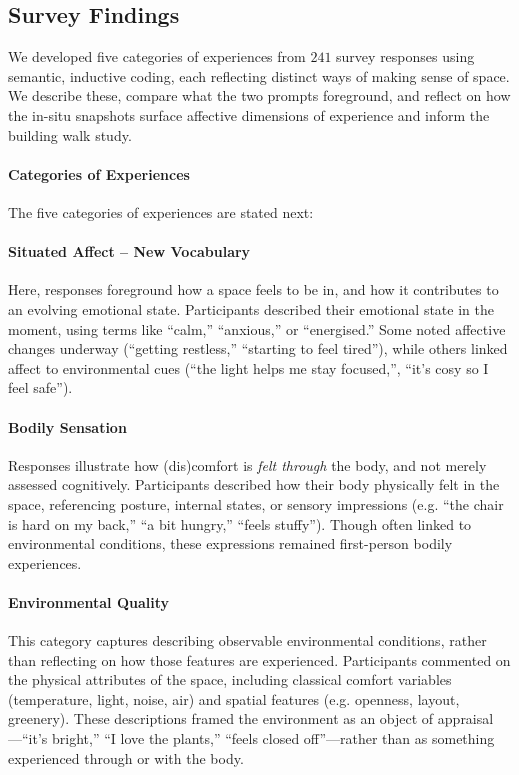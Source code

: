 \subsection{Survey Findings}
\label{sec:ch3-s1-findings}
We developed five categories of experiences from  $241$ survey responses using semantic, inductive coding, each reflecting distinct ways of making sense of space. We describe these, compare what the two prompts foreground, and reflect on how the in-situ snapshots surface affective dimensions of experience and inform the building walk study.

\paragraph{Categories of Experiences} The five categories of experiences are stated next: 

\paragraph{\textbf{Situated Affect – New Vocabulary}} Here, responses foreground how a space feels to be in, and how it contributes to an evolving emotional state. Participants described their emotional state in the moment, using terms like ``calm,'' ``anxious,'' or ``energised.'' Some noted affective changes underway (``getting restless,'' “starting to feel tired”), while others linked affect to environmental cues (``the light helps me stay focused,'', ``it’s cosy so I feel safe''). 

\paragraph{\textbf{Bodily Sensation}} Responses illustrate how (dis)comfort is \textit{felt through} the body, and not merely assessed cognitively. Participants described how their body physically felt in the space, referencing posture, internal states, or sensory impressions (e.g. ``the chair is hard on my back,'' ``a bit hungry,'' ``feels stuffy''). Though often linked to environmental conditions, these expressions remained first-person bodily experiences. 

\paragraph{\textbf{Environmental Quality}} This category captures describing observable environmental conditions, rather than reflecting on how those features are experienced. Participants commented on the physical attributes of the space, including classical comfort variables (temperature, light, noise, air) and spatial features (e.g. openness, layout, greenery). These descriptions framed the environment as an object of appraisal---``it’s bright,'' ``I love the plants,'' ``feels closed off''---rather than as something experienced through or with the body. 

